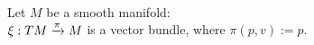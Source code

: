 \\ Let $M$ be a smooth manifold:
\\ $\xi: TM \xrightarrow{\pi} M$ is a vector bundle, where $\pi(p, v) := p$.